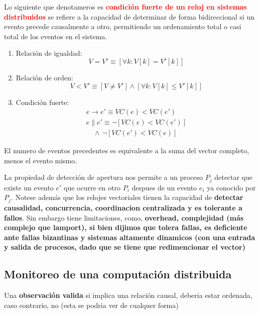  Lo siguiente que denotameros es \textcolor{red}{\textbf{condición fuerte de un reloj en sistemas distribuidos}} se refiere a la capacidad de determinar de forma bidireccional si un evento precede causalmente a otro, permitiendo un ordenamiento total o casi total de los eventos en el sistema.
\begin{enumerate}
  \item Relación de igualdad:
    {
      \setlength{\abovedisplayskip}{3pt}
      \setlength{\belowdisplayskip}{3pt}
      {\tiny \[\textstyle
      V=V' \equiv [\forall k: V[k]=V'[k]]
      \]}
    }
  \item Relación de orden:
    {
      \setlength{\abovedisplayskip}{3pt}
      \setlength{\belowdisplayskip}{3pt}
      {\tiny \[\textstyle
      V<V' \equiv [V \neq V'] \land [\forall k: V[k] \leq V'[k]]
      \]}
    }
 \item Condición fuerte:
  {
    \setlength{\abovedisplayskip}{3pt}
    \setlength{\belowdisplayskip}{3pt}
    {\tiny \[\textstyle
      \begin{gathered}
        e \rightarrow e' \equiv VC(e) < VC(e') \\
        e \| e' \equiv \lnot [VC(e)<VC(e')] \\
        \quad \land\, \lnot [VC(e')<VC(e)]
      \end{gathered}
    \]}
  }\end{enumerate}
 El  numero de eventos precedentes es equivalente a la suma del vector completo, menos el evento mismo.

 La propiedad de detección de apertura nos permite a un proceso $P_j$ detectar que existe un evento $e'$ que ocurre en otro $P_i$ despues de un evento $e_i$ ya conocido por $P_j$. Notese además que los relojes vectoriales tienen la capacidad de \textbf{detectar causalidad, concurrencia, coordinacion centralizada y es tolerante a fallos}. Sin embargo tiene limitaciones, como, \textbf{overhead, complejidad (más complejo que lamport), si bien dijimos que tolera fallas, es deficiente ante fallas bizantinas y sistemas altamente dinamicos (con una entrada y salida de procesos, dado que se tiene que redimencionar el vector)}

 \subsection{Monitoreo de una computación distribuida}

 Una \textbf{observación valida} si implica una relación causal, deberia estar ordenada, caso contrario, no (esta se podria ver de cualquer forma) 

